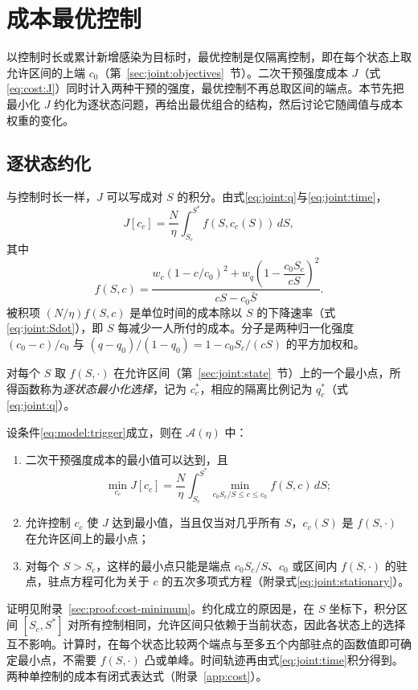 \section{成本最优控制}
\label{sec:joint:cost}
以控制时长或累计新增感染为目标时，最优控制是仅隔离控制，即在每个状态上取允许区间的上端 $c_0$（第~\ref{sec:joint:objectives}~节）。二次干预强度成本 $J$（式\eqref{eq:cost:J}）同时计入两种干预的强度，最优控制不再总取区间的端点。本节先把最小化 $J$ 约化为逐状态问题，再给出最优组合的结构，然后讨论它随阈值与成本权重的变化。

\subsection{逐状态约化}
与控制时长一样，$J$ 可以写成对 $S$ 的积分。由式\eqref{eq:joint:q}与\eqref{eq:joint:time}，
\begin{equation}
J[c_c]=\frac{N}{\eta}\int_{S_c}^{S^*}f(S,c_c(S))\,dS,
\label{eq:joint:cost}
\end{equation}
其中
\begin{equation}
f(S,c)=
\frac{w_c(1-c/c_0)^2+w_q\left(1-\dfrac{c_0S_c}{cS}\right)^2}
{cS-c_0\bar S}.
\label{eq:joint:cost-integrand}
\end{equation}
被积项 $(N/\eta)f(S,c)$ 是单位时间的成本除以 $S$ 的下降速率（式\eqref{eq:joint:Sdot}），即 $S$ 每减少一人所付的成本。分子是两种归一化强度 $(c_0-c)/c_0$ 与 $(q-q_0)/(1-q_0)=1-c_0S_c/(cS)$ 的平方加权和。

对每个 $S$ 取 $f(S,\cdot)$ 在允许区间（第~\ref{sec:joint:state}~节）上的一个最小点，所得函数称为\emph{逐状态最小化选择}，记为 $c_c^*$，相应的隔离比例记为 $q_c^*$（式\eqref{eq:joint:q}）。
\begin{theorem}
\label{thm:joint:cost-minimum}
设条件\eqref{eq:model:trigger}成立，则在 $\mathcal A(\eta)$ 中：
\begin{enumerate}
\renewcommand{\labelenumi}{(\roman{enumi})}
\item 二次干预强度成本的最小值可以达到，且
\begin{equation}
\min_{c_c}J[c_c]
=\frac{N}{\eta}\int_{S_c}^{S^*}
\min_{c_0S_c/S\le c\le c_0}f(S,c)\,dS;
\label{eq:joint:minimum-cost}
\end{equation}
\item 允许控制 $c_c$ 使 $J$ 达到最小值，当且仅当对几乎所有 $S$，$c_c(S)$ 是 $f(S,\cdot)$ 在允许区间上的最小点；
\item 对每个 $S>S_c$，这样的最小点只能是端点 $c_0S_c/S$、$c_0$ 或区间内 $f(S,\cdot)$ 的驻点，驻点方程可化为关于 $c$ 的五次多项式方程（附录式\eqref{eq:joint:stationary}）。
\end{enumerate}
\end{theorem}
证明见附录~\ref{sec:proof:cost-minimum}。约化成立的原因是，在 $S$ 坐标下，积分区间 $[S_c,S^*]$ 对所有控制相同，允许区间只依赖于当前状态，因此各状态上的选择互不影响。计算时，在每个状态比较两个端点与至多五个内部驻点的函数值即可确定最小点，不需要 $f(S,\cdot)$ 凸或单峰。时间轨迹再由式\eqref{eq:joint:time}积分得到。两种单控制的成本有闭式表达式（附录~\ref{app:cost}）。

